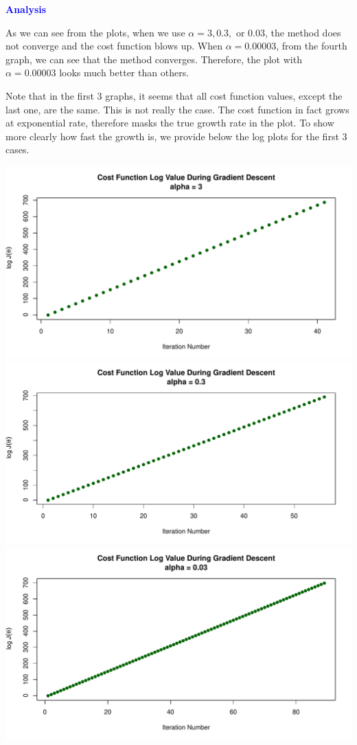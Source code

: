 \documentclass[a4paper,12pt]{article}
\begin{document}
\noindent\textcolor{blue}{\textbf{Analysis}}
\medskip

As we can see from the plots, when we use $\alpha = 3, 0.3,$ or $0.03$, the method does not converge and the cost function blows up. When $\alpha=0.00003$, from the fourth graph, we can see that the method converges. Therefore, the plot with $\alpha=0.00003$ looks much better than others.

Note that in the first 3 graphs, it seems that all cost function values, except the last one, are the same. This is not really the case. The cost function in fact grows at exponential rate, therefore masks the true growth rate in the plot. To show more clearly how fast the growth is, we provide below the log plots for the first 3 cases.



\begin{center}
    \includegraphics[width=0.9\linewidth]{Images/Prob1-8-alpha1-log.pdf}
    \includegraphics[width=0.9\linewidth]{Images/Prob1-8-alpha2-log.pdf}
    \includegraphics[width=0.9\linewidth]{Images/Prob1-8-alpha3-log.pdf}
\end{center}
\end{document}
